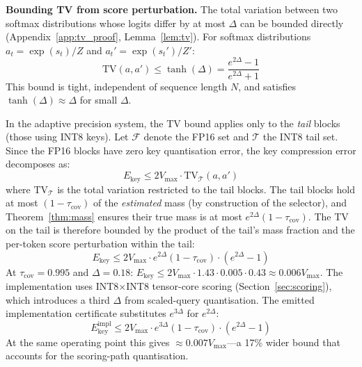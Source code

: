 \documentclass[10pt,twocolumn,a4paper]{article}
\theoremstyle{definition}
\theoremstyle{remark}
\begin{document}
\textbf{Bounding TV from score perturbation.}  The total variation between two softmax distributions whose logits differ by at most $\Delta$ can be bounded directly (Appendix~\ref{app:tv_proof}, Lemma~\ref{lem:tv}).  For softmax distributions $a_t = \exp(s_t) / Z$ and $a_t' = \exp(s_t') / Z'$:
\begin{equation}
\label{eq:tv_bound}
  \mathrm{TV}(a, a') \leq \tanh(\Delta) = \frac{e^{2\Delta} - 1}{e^{2\Delta} + 1}
\end{equation}
This bound is tight, independent of sequence length $N$, and satisfies $\tanh(\Delta) \approx \Delta$ for small $\Delta$.

In the adaptive precision system, the TV bound applies only to the \emph{tail} blocks (those using INT8 keys).  Let $\mathcal{F}$ denote the FP16 set and $\mathcal{T}$ the INT8 tail set.  Since the FP16 blocks have zero key quantisation error, the key compression error decomposes as:
\begin{equation}
  E_{\mathrm{key}} \leq 2 V_{\max} \cdot \mathrm{TV}_{\mathcal{T}}(a, a')
\end{equation}
where $\mathrm{TV}_{\mathcal{T}}$ is the total variation restricted to the tail blocks.  The tail blocks hold at most $(1 - \tau_{\mathrm{cov}})$ of the \emph{estimated} mass (by construction of the selector), and Theorem~\ref{thm:mass} ensures their true mass is at most $e^{2\Delta}(1 - \tau_{\mathrm{cov}})$.  The TV on the tail is therefore bounded by the product of the tail's mass fraction and the per-token score perturbation within the tail:
\begin{equation}
  E_{\mathrm{key}} \leq 2 V_{\max} \cdot e^{2\Delta} (1 - \tau_{\mathrm{cov}}) \cdot (e^{2\Delta} - 1)
\end{equation}
At $\tau_{\mathrm{cov}} = 0.995$ and $\Delta = 0.18$: $E_{\mathrm{key}} \leq 2 V_{\max} \cdot 1.43 \cdot 0.005 \cdot 0.43 \approx 0.006 V_{\max}$.  The implementation uses INT8$\times$INT8 tensor-core scoring (Section~\ref{sec:scoring}), which introduces a third $\Delta$ from scaled-query quantisation.  The emitted implementation certificate substitutes $e^{3\Delta}$ for $e^{2\Delta}$:
\begin{equation}
\label{eq:impl_key}
  E_{\mathrm{key}}^{\mathrm{impl}} \leq 2 V_{\max} \cdot e^{3\Delta} (1 - \tau_{\mathrm{cov}}) \cdot (e^{2\Delta} - 1)
\end{equation}
At the same operating point this gives $\approx 0.007 V_{\max}$---a 17\% wider bound that accounts for the scoring-path quantisation.
\end{document}
